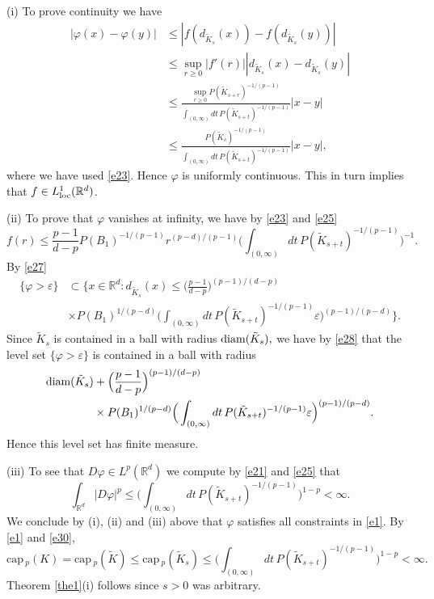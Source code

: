 \documentclass[a4paper,9pt]{article}
\newcommand{\R}{\mathbb{R}}
\def\cp{\mathrm{cap}\,}
\begin{document}
\noindent(i) To prove continuity we have
\begin{align*}%
|\varphi(x)-\varphi(y)|&\le |f(d_{\tilde{K}_s}(x))-f(d_{\tilde{K}_s}(y))|\nonumber\\& \le \sup_{r\ge 0}|f'(r)||d_{\tilde{K}_s}(x)-d_{\tilde{K}_s}(y)|\nonumber\\&\le
\frac{\sup_{r\ge 0}P(\tilde{K}_{s+r})^{-1/(p-1)}}{\int_{(0,\infty)}dt\, P(\tilde{K}_{s+t})^{-1/(p-1)}}|x-y|\nonumber\\&
\le\frac{P(\tilde{K}_s)^{-1/(p-1)}}{\int_{(0,\infty)}dt\, P(\tilde{K}_{s+t})^{-1/(p-1)}}|x-y|,
\end{align*}
where we have used \eqref{e23}. Hence $\varphi$ is uniformly continuous. This in turn implies that $f\in L^1_\textup{loc}(\R^d)$.

\smallskip


\noindent(ii) To prove that $\varphi$ vanishes at infinity, we have by \eqref{e23} and \eqref{e25}
\begin{equation}\label{e27}
f(r)\le \frac{p-1}{d-p}P(B_1)^{-1/(p-1)}r^{(p-d)/(p-1)}\Big(\int_{(0,\infty)}dt\, P(\tilde{K}_{s+t})^{-1/(p-1)}\Big)^{-1}.
\end{equation}
By \eqref{e27}
\begin{align}\label{e28}
\{\varphi>\varepsilon\}&\subset\Big\{x\in\R^d: d_{\tilde{K}_s}(x)\le \Big(\frac{p-1}{d-p}\Big)^{(p-1)/(d-p)}\nonumber\\&
\times P(B_1)^{1/(p-d)}\Big(\int_{(0,\infty)}dt\, P(\tilde{K}_{s+t})^{-1/(p-1)}\varepsilon\Big)^{(p-1)/(p-d)}\Big\}.
\end{align}
Since $\tilde{K}_s$ is contained in a ball with radius $\textup{diam}(\tilde{K}_s),$ we have by \eqref{e28} that the level set $\{\varphi>\varepsilon\}$
is contained in a ball with radius
\begin{align*}%
\textup{diam}(\tilde{K}_s)&+\Big(\frac{p-1}{d-p}\Big)^{(p-1)/(d-p)}\nonumber\\&
\times P(B_1)^{1/(p-d)}\Big(\int_{(0,\infty)}dt\, P(\tilde{K}_{s+t})^{-1/(p-1)}\varepsilon\Big)^{(p-1)/(p-d)}.
\end{align*}
Hence this level set has finite measure.

\smallskip


\noindent(iii) To see that $D\varphi\in L^p(\R^d)$ we compute
by \eqref{e21} and \eqref{e25} that
\begin{equation}\label{e30}
\int_{\R^d}|D\varphi|^p\le\Big(\int_{(0,\infty)}dt\, P(\tilde{K}_{s+t})^{-1/(p-1)}\Big)^{1-p}<\infty.
\end{equation}
We conclude by (i), (ii) and (iii) above that $\varphi$ satisfies all constraints in \eqref{e1}. By \eqref{e1} and \eqref{e30},
\begin{equation}\label{e31}
\cp_p(K)= \cp_p(\tilde{K})\le \cp_p(\tilde{K}_s)\le \Big(\int_{(0,\infty)}dt\, P(\tilde{K}_{s+t})^{-1/(p-1)}\Big)^{1-p}<\infty.
\end{equation}
Theorem \ref{the1}(i) follows since $s>0$ was arbitrary.
\end{document}
